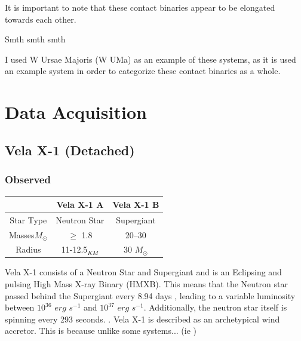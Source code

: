\documentclass[12pt, letterpaper]{article}
\begin{document}
        It is important to note that these contact binaries appear to be elongated towards each other. 

        Smth smth smth

        I used W Ursae Majoris (W UMa) as an example of these systems, as it is used an example system in order to categorize these contact binaries as a whole.

        
\section{\centering Data Acquisition}
    \subsection{\centering Vela X-1 (Detached)}
    
        \subsubsection{Observed}
        \begin{center}
            \begin{tabular}{||c c c||} 
             \hline
             & Vela X-1 A & Vela X-1 B  \\ 
             \hline\hline
             Star Type & Neutron Star & Supergiant \cite{Kretschmar_2021} \\ 
             \hline
             Masses\(M_\odot\) & $\ge$ 1.8 \cite{Kretschmar_2021} & 20–30 \cite{Kretschmar_2021} \\
             \hline
             Radius & 11-12.5$_{KM}$ \cite{Kretschmar_2021} & 30 \(M_\odot\)
             \cite{Kretschmar_2021} \\ %
             \hline 
            \end{tabular}
        \end{center}
        Vela X-1 consists of a Neutron Star and Supergiant and is an Eclipsing and pulsing High Mass X-ray Binary (HMXB). This means that the Neutron star passed behind the Supergiant every 8.94 days \cite{Falanga_2015}, leading to a variable luminosity between $10^{36}$ $erg$ $s^{-1}$ and $10^{37}$ $erg$ $s^{-1}$. Additionally, the neutron star itself is spinning every 293 seconds. \cite{Kretschmar_2021}. 
        Vela X-1 is described as an archetypical wind accretor. This is because unlike some systems... (ie \cite{Kretschmar_2021}) 
            
\end{document}

